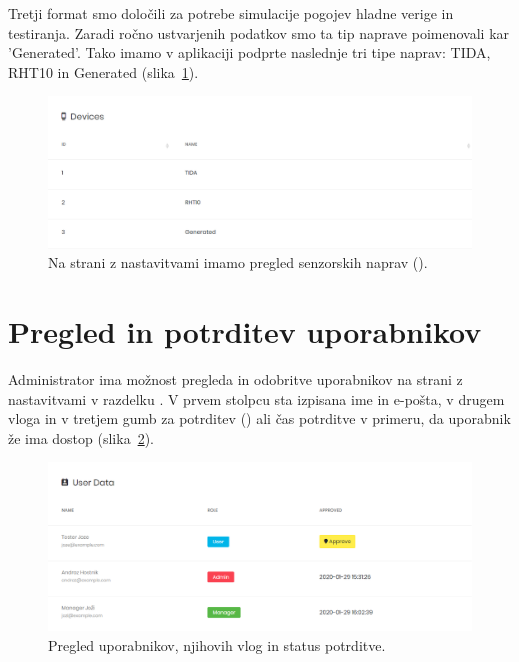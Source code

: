 \documentclass[a4paper, 12pt]{book}
\begin{document}
Tretji format smo določili za potrebe simulacije pogojev hladne verige in testiranja. Zaradi ročno ustvarjenih podatkov smo ta tip naprave poimenovali kar 'Generated'.
Tako imamo v aplikaciji podprte naslednje tri tipe naprav: TIDA, RHT10 in Generated (slika~\ref{ss-settings-devices}).

\begin{figure}[h]
\begin{center}
\includegraphics[width=\textwidth]{slike/devices.png}
\end{center}
\caption{Na strani z nastavitvami imamo pregled senzorskih naprav ().}
\label{ss-settings-devices}
\end{figure}


\clearpage


\section{Pregled in potrditev uporabnikov}

Administrator ima možnost pregleda in odobritve uporabnikov na strani z nastavitvami v razdelku . V prvem stolpcu sta izpisana ime in e-pošta, v drugem vloga in v tretjem gumb za potrditev () ali čas potrditve v primeru, da uporabnik že ima dostop (slika~\ref{ss-settings-users}).

\begin{figure}[h]
\begin{center}
\includegraphics[width=\textwidth]{slike/users.png}
\end{center}
\caption{Pregled uporabnikov, njihovih vlog in status potrditve.}
\label{ss-settings-users}
\end{figure}
\end{document}
